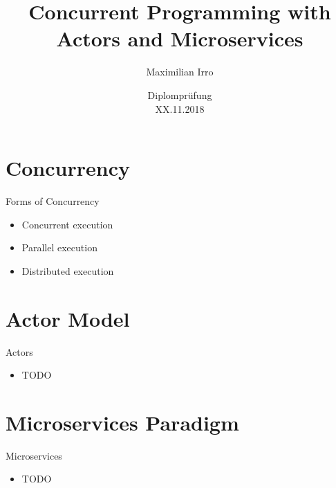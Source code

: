\documentclass{beamer}
\title[Your Short Title]{Concurrent Programming with\\Actors and Microservices}
\author{Maximilian Irro}
\date{Diplomprüfung\\XX.11.2018}
\begin{document}
\begin{frame}
  \titlepage
\end{frame}


\section{Concurrency}


\begin{frame}{Forms of Concurrency}

\begin{itemize}
  \item Concurrent execution
  \item Parallel execution
  \item Distributed execution
\end{itemize}

\end{frame}


\section{Actor Model}

\begin{frame}{Actors}

\begin{itemize}
  \item TODO
\end{itemize}

\end{frame}

\section{Microservices Paradigm}

\begin{frame}{Microservices}

\begin{itemize}
  \item TODO
\end{itemize}

\end{frame}
\end{document}
